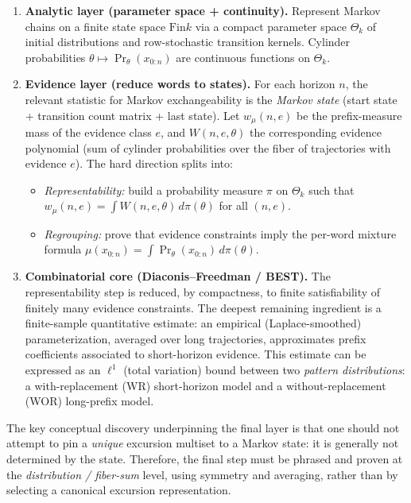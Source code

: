 \documentclass[11pt]{article}
\newcommand{\Fin}{\mathrm{Fin}}
\begin{document}
\begin{enumerate}[label=\textbf{L\arabic*}.]
\item \textbf{Analytic layer (parameter space + continuity).}
Represent Markov chains on a finite state space $\Fin k$ via a compact parameter space
$\Theta_k$ of initial distributions and row-stochastic transition kernels.
Cylinder probabilities $\theta \mapsto \Pr_\theta(x_{0:n})$ are continuous functions on $\Theta_k$.

\item \textbf{Evidence layer (reduce words to states).}
For each horizon $n$, the relevant statistic for Markov exchangeability is the
\emph{Markov state} (start state + transition count matrix + last state).
Let $w_\mu(n,e)$ be the prefix-measure mass of the evidence class $e$,
and $W(n,e,\theta)$ the corresponding evidence polynomial (sum of cylinder probabilities over the
fiber of trajectories with evidence $e$). The hard direction splits into:
\begin{itemize}
\item \emph{Representability:} build a probability measure $\pi$ on $\Theta_k$ such that
$w_\mu(n,e)=\int W(n,e,\theta)\,d\pi(\theta)$ for all $(n,e)$.
\item \emph{Regrouping:} prove that evidence constraints imply the per-word mixture formula
$\mu(x_{0:n})=\int \Pr_\theta(x_{0:n})\,d\pi(\theta)$.
\end{itemize}

\item \textbf{Combinatorial core (Diaconis--Freedman / BEST).}
The representability step is reduced, by compactness, to finite satisfiability of finitely many
evidence constraints. The deepest remaining ingredient is a finite-sample quantitative estimate:
an empirical (Laplace-smoothed) parameterization, averaged over long trajectories, approximates
prefix coefficients associated to short-horizon evidence. This estimate can be expressed as an
$\ell^1$ (total variation) bound between two \emph{pattern distributions}:
a with-replacement (WR) short-horizon model and a without-replacement (WOR) long-prefix model.
\end{enumerate}

The key conceptual discovery underpinning the final layer is that one should not attempt to pin a
\emph{unique} excursion multiset to a Markov state: it is generally not determined by the state.
Therefore, the final step must be phrased and proven at the \emph{distribution / fiber-sum} level,
using symmetry and averaging, rather than by selecting a canonical excursion representation.
\end{document}
